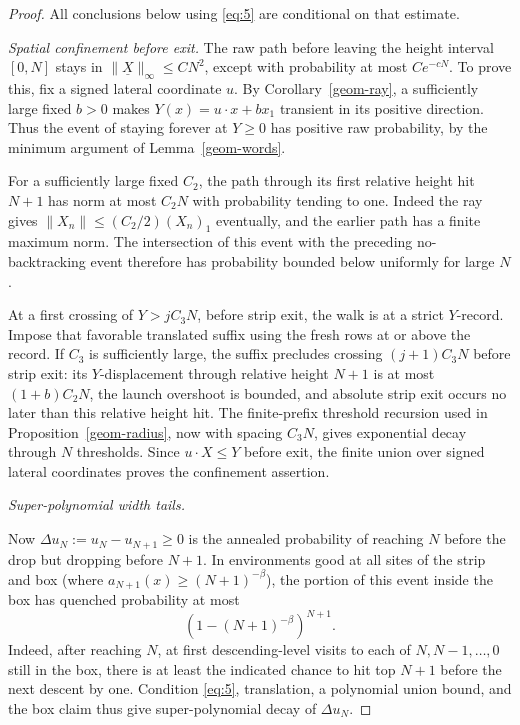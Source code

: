 \begin{proof}
All conclusions below using \eqref{eq:5} are conditional on that estimate.

\smallskip\noindent\emph{Spatial confinement before exit.}
The raw path before leaving the height interval \([0,N]\) stays in
\(\|\underline X\|_\infty\le CN^2\), except with probability at most
\(Ce^{-cN}\). To prove this, fix a signed lateral coordinate \(u\).
By Corollary~\ref{geom-ray}, a sufficiently large fixed \(b>0\) makes
\(Y(x)=u\cdot x+bx_1\) transient in its positive direction. Thus the
event of staying forever at \(Y\ge0\) has positive raw probability,
by the minimum argument of Lemma~\ref{geom-words}.

For a sufficiently large fixed \(C_2\), the path through its first
relative height hit \(N+1\) has norm at most \(C_2N\) with probability
tending to one. Indeed the ray gives
\(\|X_n\|\le(C_2/2)(X_n)_1\) eventually, and the earlier path has a
finite maximum norm. The intersection of this event with the preceding
no-backtracking event therefore has probability bounded below uniformly
for large \(N\).

At a first crossing of \(Y>jC_3N\), before strip exit, the walk is at
a strict \(Y\)-record. Impose that favorable translated suffix using
the fresh rows at or above the record. If \(C_3\) is sufficiently large,
the suffix precludes crossing \((j+1)C_3N\) before strip exit: its
\(Y\)-displacement through relative height \(N+1\) is at most
\((1+b)C_2N\), the launch overshoot is bounded, and absolute strip
exit occurs no later than this relative height hit. The finite-prefix
threshold recursion used in Proposition~\ref{geom-radius}, now with
spacing \(C_3N\), gives exponential decay through \(N\) thresholds.
Since \(u\cdot X\le Y\) before exit, the finite union over signed
lateral coordinates proves the confinement assertion.

\smallskip\noindent\emph{Super-polynomial width tails.}

Now \(\Delta u_N:=u_N-u_{N+1}\ge0\) is the annealed probability of reaching \(N\) before the drop but dropping before \(N+1\). In environments good at all sites of the strip and box (where \(a_{N+1}(x)\ge(N+1)^{-\beta}\)), the portion of this event inside the box has quenched probability at most
\[
(1-(N+1)^{-\beta})^{N+1}.
\]
Indeed, after reaching \(N\), at first descending-level visits to each of \(N,N-1,\ldots,0\) still in the box, there is at least the indicated chance to hit top \(N+1\) before the next descent by one. Condition \eqref{eq:5}, translation, a polynomial union bound, and the box claim thus give super-polynomial decay of \(\Delta u_N\).


\end{proof}
